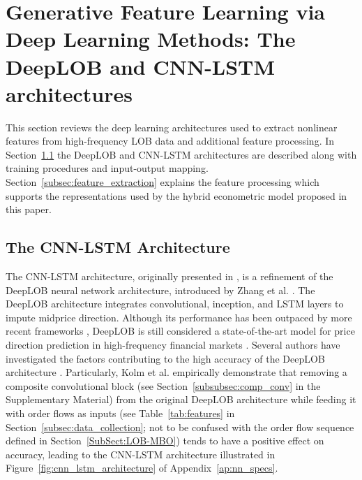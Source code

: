 \documentclass[10pt,a4paper,oneside]{article}
\begin{document}
\section{Generative Feature Learning via Deep Learning Methods: The DeepLOB and CNN-LSTM architectures}
\label{Sect:Features}
This section reviews the deep learning architectures used to extract nonlinear features from high-frequency LOB data and additional feature processing. In Section~\ref{subsec:cnn_lstm} the DeepLOB \cite{zhang2021deeplearningmarketorder} and CNN-LSTM architectures \cite{kolm2023deep} are described along with training procedures and input-output mapping. Section~\ref{subsec:feature_extraction} explains the feature processing which supports the representations used by the hybrid econometric model proposed in this paper.
\subsection{The CNN-LSTM Architecture}
\label{subsec:cnn_lstm}
The CNN-LSTM architecture, originally presented in \cite{kolm2023deep}, is a refinement of the DeepLOB neural network architecture, introduced by Zhang et al. \cite{Zhang_2019}. The DeepLOB architecture integrates convolutional, inception, and LSTM layers to impute midprice direction. Although its performance has been outpaced by more recent frameworks \cite{prata2024lob}, DeepLOB is still considered a state-of-the-art model for price direction prediction in high-frequency financial markets \cite{briola2024deep, kolm2023deep}. Several authors have investigated the factors contributing to the high accuracy of the DeepLOB architecture \cite{kolm2023deep, kolm2024improving, briola2024deep}. Particularly, Kolm et al. \cite{kolm2023deep} empirically demonstrate that removing a composite convolutional block (see Section~\ref{subsubsec:comp_conv} in the Supplementary Material) from the original DeepLOB architecture while feeding it with order flows as inputs (see Table~\ref{tab:features} in Section~\ref{subsec:data_collection}; not to be confused with the order flow sequence defined in Section~\ref{SubSect:LOB-MBO}) tends to have a positive effect on accuracy, leading to the CNN-LSTM architecture illustrated in Figure~\ref{fig:cnn_lstm_architecture} of Appendix~\ref{ap:nn_specs}.
\end{document}
